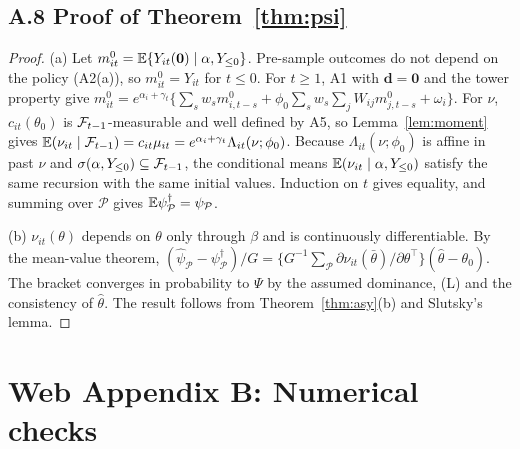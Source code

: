 \subsection{A.8 Proof of Theorem~\ref{thm:psi}}

\begin{proof}
(a) Let $m^0_{it}=\mathbb{E}\{Y_{it}(\mathbf 0)\mid\alpha,Y_{\le0}\}$. Pre-sample outcomes do not depend on the policy
(A2(a)), so $m^0_{it}=Y_{it}$ for $t\le0$. For $t\ge1$, A1 with $\mathbf d=\mathbf 0$ and the tower
property give
$m^0_{it}=e^{\alpha_i+\gamma_t}\{\sum_sw_sm^0_{i,t-s}+\phi_0\sum_sw_s\sum_jW_{ij}m^0_{j,t-s}+\omega_i\}$.
For $\nu$, $c_{it}(\theta_0)$ is $\mathcal{F}_{t-1}$-measurable and well defined by A5, so Lemma~\ref{lem:moment}
gives $\mathbb{E}(\nu_{it}\mid\mathcal{F}_{t-1})=c_{it}\mu_{it}=e^{\alpha_i+\gamma_t}\Lambda_{it}(\nu;\phi_0)$. Because
$\Lambda_{it}(\nu;\phi_0)$ is affine in past $\nu$ and $\sigma(\alpha,Y_{\le0})\subseteq\mathcal{F}_{t-1}$, the
conditional means $\mathbb{E}(\nu_{it}\mid\alpha,Y_{\le0})$ satisfy the same recursion with the same initial
values. Induction on $t$ gives equality, and summing over $\mathcal P$ gives
$\mathbb{E}\psi^\dagger_{\mathcal P}=\psi_{\mathcal P}$.

(b) $\nu_{it}(\theta)$ depends on $\theta$ only through $\beta$ and is continuously differentiable.
By the mean-value theorem,
$(\hat\psi_{\mathcal P}-\psi^\dagger_{\mathcal P})/G=\{G^{-1}\sum_{\mathcal P}\partial\nu_{it}(\bar\theta)/\partial\theta^{\top}\}(\hat\theta-\theta_0)$.
The bracket converges in probability to $\Psi$ by the assumed dominance, (L) and the consistency
of $\hat\theta$. The result follows from Theorem~\ref{thm:asy}(b) and Slutsky's lemma.
\end{proof}



\section*{Web Appendix B: Numerical checks}
\label{app:numeric}

